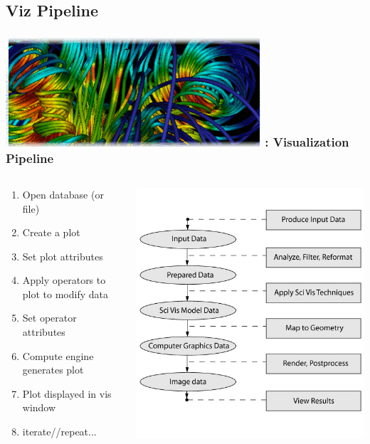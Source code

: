 \subsection{Viz Pipeline}
\begin{frame}
\frametitle{\href{https://wci.llnl.gov/simulation/computer-codes/visit/}{\includegraphics[height=.85cm]{figs/visit-logos/VisIt-01}} \hspace{-.85cm}{\bf \textcolor{lightgray}{VisIt}}: Visualization Pipeline}

\begin{columns}
\begin{column}{5cm}
\begin{beamerboxesrounded}[upper=block head,lower=block body,shadow=true]{}
\begin{enumerate}
        \item Open database (or file)
        \item Create a plot
        \item Set plot attributes
        \item Apply operators to plot to modify data
        \item Set operator attributes
        \item Compute engine generates plot
        \item Plot displayed in vis window
        \item iterate//repeat...
\end{enumerate}
\end{beamerboxesrounded}
\end{column}
\begin{column}{6cm}
        \centering
        \includegraphics[width=.85\columnwidth]{figs/viz/viz-pipeline4}
\end{column}
\end{columns}

\end{frame}

